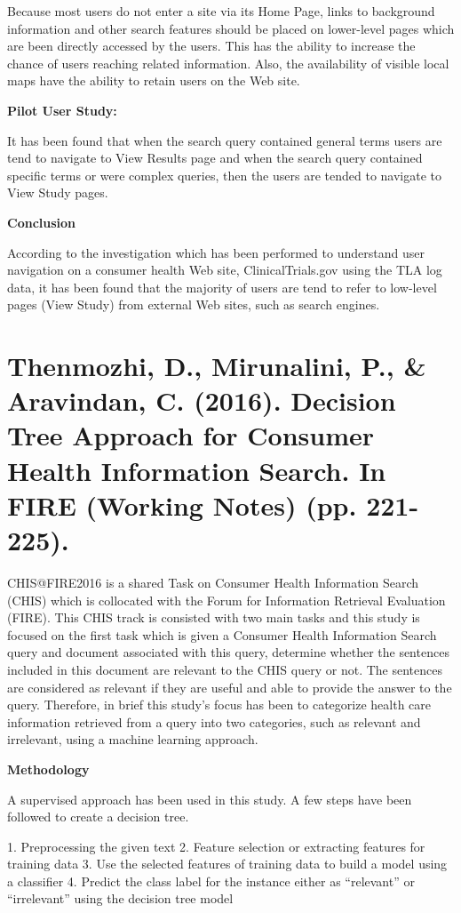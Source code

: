 \documentclass[]{article}
\begin{document}
Because most users do not enter a site via its Home Page, links to background information and other search features should be placed on lower-level pages which are been directly accessed by the users. This has the ability to increase the chance of users reaching related information. Also, the availability of visible local maps have the ability to retain users on the Web site.  

\textbf{Pilot User Study:}

It has been found that when the search query contained general terms users are tend to navigate to View Results page and when the search query contained specific terms or were complex queries, then the users are tended to navigate to View Study pages.      

\textbf{Conclusion}

According to the investigation which has been performed to understand user navigation on a consumer health Web site, ClinicalTrials.gov using the TLA log data, it has been found that the majority of users are tend to refer to low-level pages (View Study) from external Web sites, such as search engines. 

\section{Thenmozhi, D., Mirunalini, P., \& Aravindan, C. (2016). Decision Tree Approach for Consumer Health Information Search. In FIRE (Working Notes) (pp. 221-225).}

CHIS@FIRE2016 is a shared Task on Consumer Health Information Search (CHIS) which is collocated with the Forum for Information Retrieval Evaluation (FIRE). This CHIS track is consisted with two main tasks and this study is focused on the first task which is given a Consumer Health Information Search query and document associated with this query, determine whether the sentences included in this document are relevant to the CHIS query or not. The sentences are considered as relevant if they are useful and able to provide the answer to the query.  Therefore, in brief this study’s focus has been to categorize health care information retrieved from a query into two categories, such as relevant and irrelevant, using a machine learning approach.     

\textbf{Methodology}

A supervised approach has been used in this study. A few steps have been followed to create a decision tree.

1.	Preprocessing the given text
2.	Feature selection or extracting features for training data
3.	Use the selected features of training data to build a model using a classifier 
4.	Predict the class label for the instance either as “relevant” or “irrelevant” using the decision tree model
\end{document}
